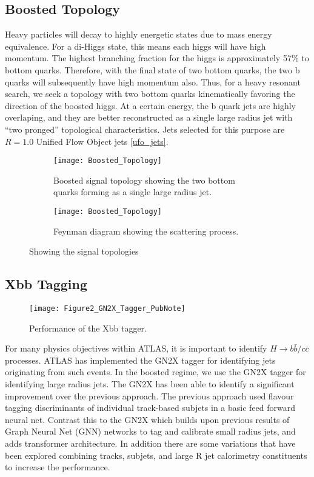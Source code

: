 \documentclass[12pt]{article}
\begin{document}
\subsection{Boosted Topology}
Heavy particles will decay to highly energetic states due to mass energy
equivalence. For a di-Higgs state, this means each higgs will have high
momentum. The highest branching fraction for the higgs is approximately 57\% to
bottom quarks. Therefore, with the final state of two bottom quarks, the two b
quarks will subsequently have high momentum also. Thus, for a heavy resonant
search, we seek a topology with two bottom quarks kinematically favoring the
direction of the boosted higgs. At a certain energy, the b quark jets are highly
overlaping, and they are better reconstructed as a single large radius jet with
``two pronged'' topological characteristics. Jets selected for this purpose are
$R=1.0$ Unified Flow Object jets \ref{ufo_jets}.
\begin{figure}[t]
    \centering
    \begin{subfigure}[t]{.48\textwidth}
        \centering
        \texttt{[image: Boosted\_Topology]}
        \caption{Boosted signal topology showing the two bottom quarks forming as a single large radius jet.}
        \label{subfig:boosted_topology}
    \end{subfigure}
    \hfill
    \begin{subfigure}[t]{.48\textwidth}
        \centering
        \texttt{[image: Boosted\_Topology]}%
        \caption{Feynman diagram showing the scattering process.}
        \label{subfig:feynman}
    \end{subfigure}
\caption{Showing the signal topologies}
\label{fig:signal_topologies}
\end{figure}
\newpage

\subsection{Xbb Tagging}
\begin{figure}[t]
    \centering
    \texttt{[image: Figure2\_GN2X\_Tagger\_PubNote]}
    \caption{Performance of the Xbb tagger.}
    \label{fig:Xbb_tagger}
\end{figure}

For many physics objectives within ATLAS, it is important to identify
$H\rightarrow b\bar{b} / c\bar{c}$ processes. ATLAS has implemented the GN2X tagger
for identifying jets originating from such events. In the boosted regime, we use
the GN2X tagger for identifying large radius jets. The GN2X has been able to
identify a significant improvement over the previous approach. The previous
approach used flavour tagging discriminants of individual track-based subjets in
a basic feed forward neural net.  Contrast this to the GN2X which builds upon
previous results of Graph Neural Net (GNN) networks to tag and calibrate small
radius jets, and adds transformer architecture. In addition there are some
variations that have been explored combining tracks, subjets, and large R jet
calorimetry constituents to increase the performance.
\end{document}
